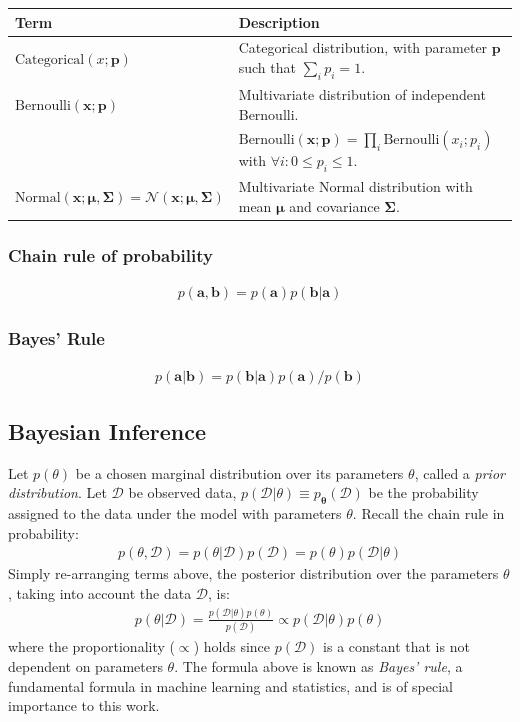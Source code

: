 \documentclass[MAL,biber]{nowfnt} %
\newcommand{\bb}[1]{\mathbf{#1}}
\newcommand{\bbb}{\bb{b}}
\newcommand{\ba}{\bb{a}}
\newcommand{\bx}{\bb{x}}
\newcommand{\bp}{\bb{p}}
\newcommand{\bT}{\boldsymbol{\theta}}
\newcommand{\bmu}{\boldsymbol{\mu}}
\newcommand{\pT}{p_{\bT}}
\begin{document}
\bgroup
\def\arraystretch{1.5}%
\begin{longtable}{| p{3cm} | p{7.5cm} |}
	\hline 
	\textbf{Term} & \textbf{Description}\\
	\hline \hline
	$\text{Categorical}(x; \bp)$ 
	& Categorical distribution, with parameter $\bp$ such that $\sum_i p_i = 1$.
	\\ \hline
	$\text{Bernoulli}(\bx; \bp)$ 
	& Multivariate distribution of independent Bernoulli.\\ & $\text{Bernoulli}(\bx; \bp) = \prod_i \text{Bernoulli}(x_i; p_i)$ with $\forall i: 0 \leq p_i \leq 1$.
	\\ \hline
	$\text{Normal}(\bx; \bmu, \boldsymbol{\Sigma}) = \mathcal{N}(\bx; \bmu, \boldsymbol{\Sigma})$ & Multivariate Normal distribution with mean $\bmu$ and covariance $\boldsymbol{\Sigma}$.
	\\ \hline
\end{longtable}
\egroup


\subsubsection{Chain rule of probability}\label{sec:chainruleprob}
\begin{align}
p(\ba,\bbb) = p(\ba)p(\bbb|\ba)
\end{align}

\subsubsection{Bayes' Rule}\label{sec:bayesrule}
\begin{align}
p(\ba|\bbb) = p(\bbb|\ba)p(\ba)/p(\bbb)
\end{align}


\subsection{Bayesian Inference}
\label{sec:bayesianinference}

Let $p(\theta)$ be a chosen marginal distribution over its parameters $\theta$, called a \emph{prior distribution}. Let $\mathcal{D}$ be observed data, $p(\mathcal{D}|\theta) \equiv \pT(\mathcal{D})$ be the probability assigned to the data under the model with parameters $\theta$. Recall the chain rule in probability:
\begin{align*}
p(\theta,\mathcal{D}) = p(\theta|\mathcal{D})p(\mathcal{D}) = p(\theta)p(\mathcal{D}|\theta)
\end{align*}
Simply re-arranging terms above, the posterior distribution over the parameters $\theta$, taking into account the data $\mathcal{D}$, is:
\begin{align}
p(\theta|\mathcal{D}) = \frac{p(\mathcal{D}|\theta)p(\theta)}{p(\mathcal{D})} \propto p(\mathcal{D}|\theta)p(\theta)
\label{eq:bayesrule}
\end{align}
where the proportionality ($\propto$) holds since $p(\mathcal{D})$ is a constant that is not dependent on parameters $\theta$. The formula above is known as \emph{Bayes' rule}, a fundamental formula in machine learning and statistics, and is of special importance to this work.
\end{document}
